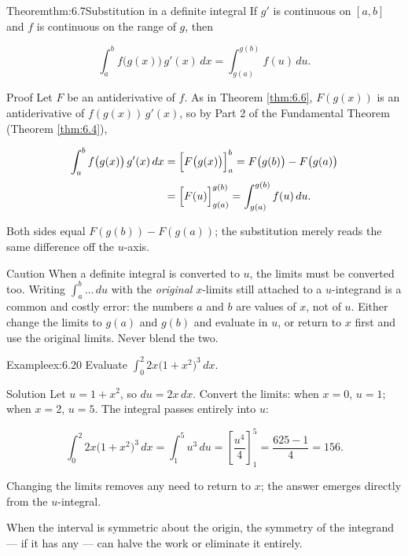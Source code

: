 \documentclass[a4paper,12pt,oneside]{memoir}
\begin{document}
\begin{envtheorem}{Theorem}{thm:6.7}{Substitution in a definite integral}
If \(g'\) is continuous on \([a, b]\) and \(f\) is continuous on the range of \(g\), then

\[ \int_{a}^{b} f\bigl(g(x)\bigr)\,g'(x)\,dx = \int_{g(a)}^{g(b)} f(u)\,du. \]
\end{envtheorem}
\begin{envproof}{Proof}{}{}
Let \(F\) be an antiderivative of \(f\). As in Theorem \ref{thm:6.6}, \(F(g(x))\) is an antiderivative of \(f(g(x))\,g'(x)\), so by Part 2 of the Fundamental Theorem (Theorem \ref{thm:6.4}),

\[ \begin{aligned}
        \int_{a}^{b} f\bigl(g(x)\bigr)\,g'(x)\,dx &= \Bigl[F\bigl(g(x)\bigr)\Bigr]_{a}^{b} = F\bigl(g(b)\bigr) - F\bigl(g(a)\bigr) \\[2pt]
                                                  &= \Bigl[F(u)\Bigr]_{g(a)}^{g(b)} = \int_{g(a)}^{g(b)} f(u)\,du.
      \end{aligned} \]

Both sides equal \(F(g(b)) - F(g(a))\); the substitution merely reads the same difference off the \(u\)-axis. \qedmark
\end{envproof}
\begin{envcaution}{Caution}{}{}
When a definite integral is converted to \(u\), the limits must be converted too. Writing \(\int_{a}^{b} \dots\,du\) with the \emph{original} \(x\)-limits still attached to a \(u\)-integrand is a common and costly error: the numbers \(a\) and \(b\) are values of \(x\), not of \(u\). Either change the limits to \(g(a)\) and \(g(b)\) and evaluate in \(u\), or return to \(x\) first and use the original limits. Never blend the two.
\end{envcaution}
\begin{workedexample}
\begin{envexample}{Example}{ex:6.20}{}
Evaluate \(\displaystyle\int_{0}^{2} 2x\bigl(1 + x^{2}\bigr)^{3}\,dx\).
\end{envexample}
\begin{envsolution}{Solution}{}{}
Let \(u = 1 + x^{2}\), so \(du = 2x\,dx\). Convert the limits: when \(x = 0\), \(u = 1\); when \(x = 2\), \(u = 5\). The integral passes entirely into \(u\):

\[ \int_{0}^{2} 2x\bigl(1 + x^{2}\bigr)^{3}\,dx = \int_{1}^{5} u^{3}\,du = \left[\frac{u^{4}}{4}\right]_{1}^{5} = \frac{625 - 1}{4} = 156. \]

Changing the limits removes any need to return to \(x\); the answer emerges directly from the \(u\)-integral. \qedmark
\end{envsolution}
\end{workedexample}
When the interval is symmetric about the origin, the symmetry of the integrand — if it has any — can halve the work or eliminate it entirely.
\end{document}
